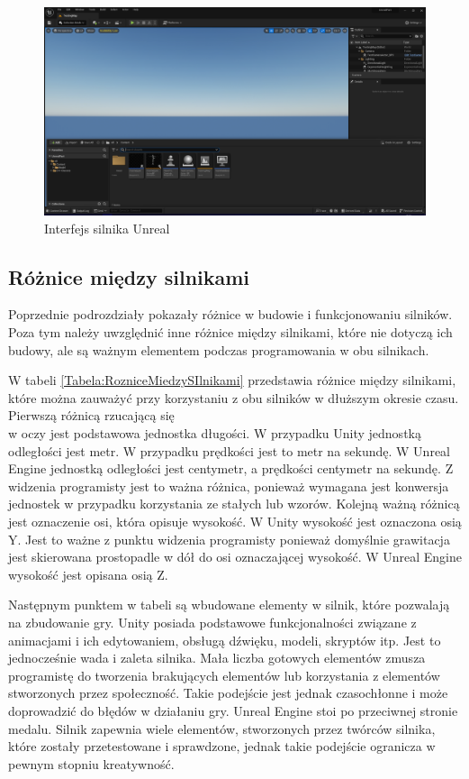 \documentclass[12pt,twoside]{article}
\begin{document}
\begin{figure}[ht]
    \centering
    \includegraphics[width=14cm]{figures/InterfejsUnreal.png}
    \caption{Interfejs silnika Unreal}
    \label{UE:Intefrface}
\end{figure}

\subsection{Różnice między silnikami}


Poprzednie podrozdziały pokazały różnice w budowie i funkcjonowaniu silników.
Poza tym należy uwzględnić inne różnice między silnikami, które nie dotyczą ich
budowy, ale są ważnym elementem podczas programowania w obu silnikach. 

W tabeli \ref{Tabela:RozniceMiedzySIlnikami} przedstawia różnice między
silnikami, które można zauważyć przy korzystaniu z obu silników w dłuższym
okresie czasu. Pierwszą różnicą rzucającą się\\w oczy jest podstawowa jednostka
długości. W przypadku Unity jednostką odległości jest metr. W przypadku
prędkości jest to metr na sekundę. W Unreal Engine jednostką odległości jest
centymetr, a prędkości centymetr na sekundę. Z widzenia programisty jest to
ważna różnica, ponieważ wymagana jest konwersja jednostek w przypadku
korzystania ze stałych lub wzorów. Kolejną ważną różnicą jest oznaczenie osi,
która opisuje wysokość. W Unity wysokość jest oznaczona osią Y. Jest to ważne z
punktu widzenia programisty ponieważ domyślnie grawitacja jest skierowana
prostopadle w dół do osi oznaczającej wysokość. W Unreal Engine wysokość jest
opisana osią Z. 

Następnym punktem w tabeli są wbudowane elementy w silnik, które pozwalają na
zbudowanie gry. Unity posiada podstawowe funkcjonalności związane z animacjami i
ich edytowaniem, obsługą dźwięku, modeli, skryptów itp. Jest to jednocześnie
wada i zaleta silnika. Mała liczba gotowych elementów zmusza programistę do tworzenia
brakujących elementów lub korzystania z elementów stworzonych przez społeczność.
Takie podejście jest jednak czasochłonne i może doprowadzić do błędów w
działaniu gry. Unreal Engine stoi po przeciwnej stronie medalu. Silnik zapewnia
wiele elementów, stworzonych przez twórców silnika, które zostały przetestowane
i sprawdzone, jednak takie podejście ogranicza w pewnym stopniu kreatywność. 
\end{document}
